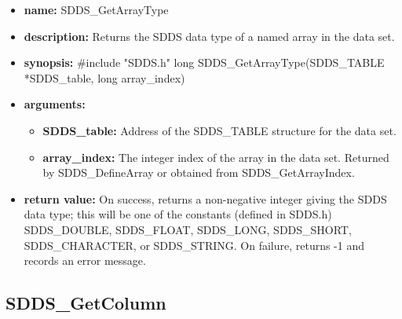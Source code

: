 \documentclass[11pt]{article}
\begin{document}
\begin{itemize}
\item {\bf name:}\newline
SDDS\_GetArrayType
\item {\bf description:}\newline
Returns the SDDS data type of a named array in the data set.
\item {\bf synopsis:} \#include "SDDS.h"\newline
long SDDS\_GetArrayType(SDDS\_TABLE *SDDS\_table, long array\_index) 
\item {\bf arguments:}
\begin{itemize}
\item {\bf SDDS\_table:} Address of the SDDS\_TABLE structure for the data set.
\item {\bf array\_index:} The integer index of the array in the data set. Returned by SDDS\_DefineArray or obtained from SDDS\_GetArrayIndex.
\end{itemize}
\item {\bf return value:}\newline
On success, returns a non-negative integer giving the SDDS data type; this will be one of the constants (defined in SDDS.h) SDDS\_DOUBLE, SDDS\_FLOAT, SDDS\_LONG, SDDS\_SHORT, SDDS\_CHARACTER, or SDDS\_STRING.\newline
\newline
On failure, returns -1 and records an error message. 
\end{itemize}

\subsection{SDDS\_GetColumn}
\label{SDDS_GetColumn}
\end{document}
